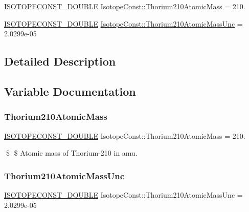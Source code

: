 \begin{DoxyCompactItemize}
\item 
\mbox{\hyperlink{group___isotope_const-_macros_ga8f45a7272ce02c0b4c65c44636ed719a}{I\+S\+O\+T\+O\+P\+E\+C\+O\+N\+S\+T\+\_\+\+D\+O\+U\+B\+LE}} \mbox{\hyperlink{group___isotope_const-_thorium-_th210_gadedddce1df8c83c1fe34f835e8a130e4}{Isotope\+Const\+::\+Thorium210\+Atomic\+Mass}} = 210.
\item 
\mbox{\hyperlink{group___isotope_const-_macros_ga8f45a7272ce02c0b4c65c44636ed719a}{I\+S\+O\+T\+O\+P\+E\+C\+O\+N\+S\+T\+\_\+\+D\+O\+U\+B\+LE}} \mbox{\hyperlink{group___isotope_const-_thorium-_th210_ga141f783761848f37e4b3c0d86527094a}{Isotope\+Const\+::\+Thorium210\+Atomic\+Mass\+Unc}} = 2.\+0299e-\/05
\end{DoxyCompactItemize}


\subsection{Detailed Description}


\subsection{Variable Documentation}
\mbox{\label{group___isotope_const-_thorium-_th210_gadedddce1df8c83c1fe34f835e8a130e4}} 
\subsubsection{\texorpdfstring{Thorium210\+Atomic\+Mass}{Thorium210AtomicMass}}
{\footnotesize\ttfamily \mbox{\hyperlink{group___isotope_const-_macros_ga8f45a7272ce02c0b4c65c44636ed719a}{I\+S\+O\+T\+O\+P\+E\+C\+O\+N\+S\+T\+\_\+\+D\+O\+U\+B\+LE}} Isotope\+Const\+::\+Thorium210\+Atomic\+Mass = 210.}

\$ \$ Atomic mass of Thorium-\/210 in amu. \mbox{\label{group___isotope_const-_thorium-_th210_ga141f783761848f37e4b3c0d86527094a}} 
\subsubsection{\texorpdfstring{Thorium210\+Atomic\+Mass\+Unc}{Thorium210AtomicMassUnc}}
{\footnotesize\ttfamily \mbox{\hyperlink{group___isotope_const-_macros_ga8f45a7272ce02c0b4c65c44636ed719a}{I\+S\+O\+T\+O\+P\+E\+C\+O\+N\+S\+T\+\_\+\+D\+O\+U\+B\+LE}} Isotope\+Const\+::\+Thorium210\+Atomic\+Mass\+Unc = 2.\+0299e-\/05}

